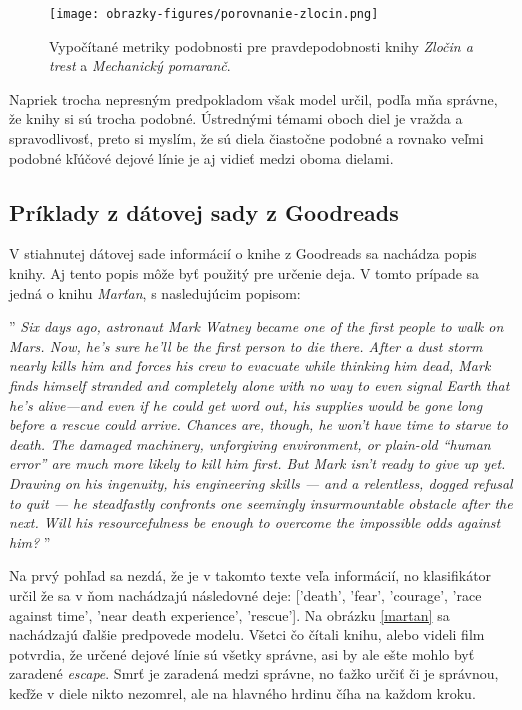 \begin{figure}[ht!]
	\centering
	\texttt{[image: obrazky-figures/porovnanie-zlocin.png]}
	\caption{Vypočítané metriky podobnosti pre pravdepodobnosti knihy \textit{Zločin a trest} a \textit{Mechanický pomaranč}.}
	\label{porovnanie-zlocin}
\end{figure}

\pagebreak
Napriek trocha nepresným predpokladom však model určil, podľa mňa správne, že knihy si sú trocha podobné.  Ústrednými témami oboch diel je vražda a spravodlivosť, preto si myslím, že sú diela čiastočne podobné a rovnako veľmi podobné kľúčové dejové línie je aj vidieť medzi oboma dielami.

\pagebreak
\subsection*{Príklady z dátovej sady z Goodreads}

V stiahnutej dátovej sade informácií o knihe z Goodreads sa nachádza popis knihy. Aj tento popis môže byť použitý pre určenie deja. V tomto prípade sa jedná o knihu \textit{Marťan}, s nasledujúcim popisom: 

\noindent''\textit{
Six days ago, astronaut Mark Watney became one of the first people to walk on Mars. Now, he’s sure he’ll be the first person to die there. After a dust storm nearly kills him and forces his crew to evacuate while thinking him dead, Mark finds himself stranded and completely alone with no way to even signal Earth that he’s alive—and even if he could get word out, his supplies would be gone long before a rescue could arrive. Chances are, though, he won’t have time to starve to death. The damaged machinery, unforgiving environment, or plain-old “human error” are much more likely to kill him first. But Mark isn’t ready to give up yet. Drawing on his ingenuity, his engineering skills — and a relentless, dogged refusal to quit — he steadfastly confronts one seemingly insurmountable obstacle after the next. Will his resourcefulness be enough to overcome the impossible odds against him?
}''

Na prvý pohľad sa nezdá, že je v takomto texte veľa informácií, no klasifikátor určil že sa v ňom nachádzajú následovné deje: ['death', 'fear', 'courage', 'race against time', 'near death experience', 'rescue']. Na obrázku \ref{martan} sa nachádzajú ďalšie predpovede modelu. Všetci čo čítali knihu, alebo videli film potvrdia, že určené dejové línie sú všetky správne, asi by ale ešte mohlo byť zaradené \textit{escape}. Smrť je zaradená medzi správne, no ťažko určiť či je správnou, keďže v diele nikto nezomrel, ale na hlavného hrdinu číha na každom kroku. 

